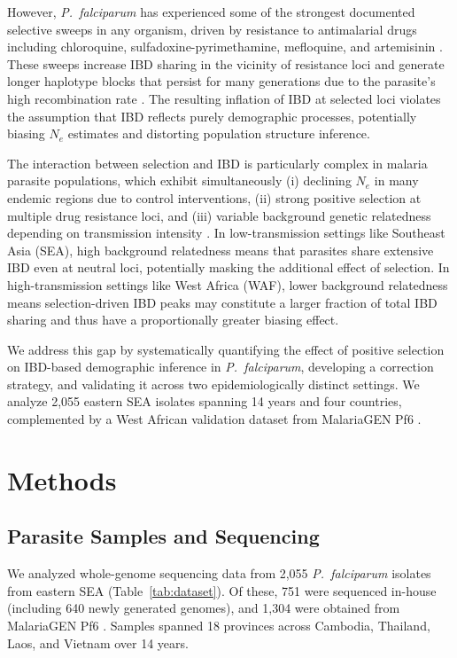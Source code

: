 \documentclass[11pt]{article}
\begin{document}
However, \textit{P.~falciparum} has experienced some of the strongest documented selective sweeps in any organism, driven by resistance to antimalarial drugs including chloroquine, sulfadoxine-pyrimethamine, mefloquine, and artemisinin \citep{ariey2014kelch13, miotto2015resistance}. These sweeps increase IBD sharing in the vicinity of resistance loci and generate longer haplotype blocks that persist for many generations due to the parasite's high recombination rate \citep{schaffner2018plasmodium}. The resulting inflation of IBD at selected loci violates the assumption that IBD reflects purely demographic processes, potentially biasing $N_e$ estimates and distorting population structure inference.

The interaction between selection and IBD is particularly complex in malaria parasite populations, which exhibit simultaneously (i) declining $N_e$ in many endemic regions due to control interventions, (ii) strong positive selection at multiple drug resistance loci, and (iii) variable background genetic relatedness depending on transmission intensity \citep{henden2018selection_ibd}. In low-transmission settings like Southeast Asia (SEA), high background relatedness means that parasites share extensive IBD even at neutral loci, potentially masking the additional effect of selection. In high-transmission settings like West Africa (WAF), lower background relatedness means selection-driven IBD peaks may constitute a larger fraction of total IBD sharing and thus have a proportionally greater biasing effect.

We address this gap by systematically quantifying the effect of positive selection on IBD-based demographic inference in \textit{P.~falciparum}, developing a correction strategy, and validating it across two epidemiologically distinct settings. We analyze 2,055 eastern SEA isolates spanning 14 years and four countries, complemented by a West African validation dataset from MalariaGEN Pf6 \citep{malariagen2021pf6}.

\section{Methods}

\subsection{Parasite Samples and Sequencing}

We analyzed whole-genome sequencing data from 2,055 \textit{P.~falciparum} isolates from eastern SEA (Table~\ref{tab:dataset}). Of these, 751 were sequenced in-house (including 640 newly generated genomes), and 1,304 were obtained from MalariaGEN Pf6 \citep{malariagen2021pf6}. Samples spanned 18 provinces across Cambodia, Thailand, Laos, and Vietnam over 14 years.
\end{document}
